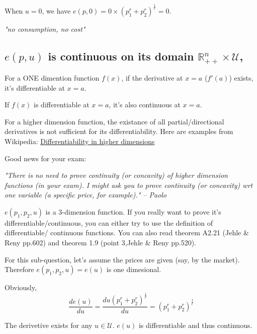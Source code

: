 \documentclass{article}
\newcommand{\R}{\mathbb{R}}
\begin{document}
When $u = 0$, we have $e(p,0) = 0 \times (p_1^{r} + p_2^{r})^{\frac{1}{r}} =0$.

\textit{"no consumption, no cost"}

\subsection{$e(p, u)$ is continuous on its domain $\R^n_{++} \times \mathcal{U}$,}


\begin{mdframed}[backgroundcolor=blue!20,linecolor=white]
For a ONE dimention function $f(x)$, if the derivative at $x = a$ ($f'(a)$) exists, it's differentiable at $x = a$.

If $f(x)$ is differentiable at $x = a$, it's also continuous at $x = a$.

For a higher dimension function, the existance of all partial/directional derivatives is not
sufficient for its differentiability. Here are examples from Wikipedia: \href{https://en.wikipedia.org/wiki/Differentiable_function}{Differentiability in higher dimensions}
\end{mdframed}

\begin{mdframed}[backgroundcolor=yellow!20,linecolor=white]
Good news for your exam:

\textit{"There is no need to prove continuity (or concavity) of higher dimension functions (in your exam). I might ask you to prove continuity (or concavity) wrt one variable (a specific price, for example)." -- Paolo}
\end{mdframed}

$e(p_1,p_2,u)$ is a 3-dimension function. If you really want to prove it's differentiable/continuous, you can either try to use the definition of differentiable/ continuous functions. 
You can also read theorem A2.21 (Jehle \& Reny pp.602) and theorem 1.9 (point 3,Jehle \& Reny
 pp.520).

For this sub-question, let's assume the prices are given (say, by the market). Therefore
$e(p_1,p_2,u) = e(u)$ is one dimesional.

Obviously, $$\frac{d e(u)}{d u} = \frac{d u(p_1^{r} + p_2^{r})^{\frac{1}{r}} }{d u} = (p_1^{r} + p_2^{r})^{\frac{1}{r}}$$

The derivetive exists for any $u \in \mathcal{U}$. $e(u)$ is differentiable and thus continuous.


\end{document}

